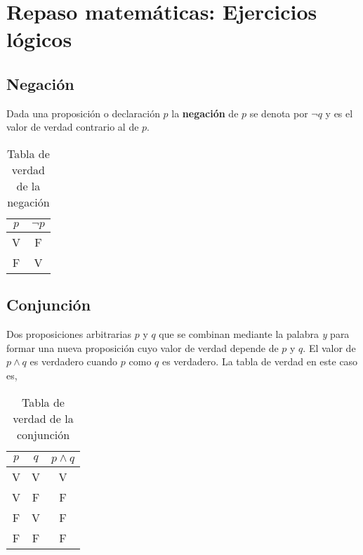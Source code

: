 \documentclass{assignment}
\begin{document}
\maketitle


\section{Repaso matemáticas: Ejercicios lógicos}

\subsection*{Negación}
Dada una proposición o declaración $p$ la \textbf{negación} de $p$ se denota por $\neg q$ y es el valor de verdad contrario al de $p$.

\begin{table}[h]
    \centering
    \begin{tabular}{|c|c|}
    \hline
    $p$  & $\neg p$    \\
    \hline
    V  & F    \\
    \hline
    F  & V    \\
    \hline
    \end{tabular}
    \caption{Tabla de verdad de la negación}

\end{table}


\subsection*{Conjunción}
Dos proposiciones arbitrarias $p$ y $q$ que se combinan mediante la palabra \emph{y} para formar una nueva proposición cuyo valor de verdad depende de $p$ y $q.$ El valor de $p \wedge q$ es verdadero cuando $p$ como $q$ es verdadero. La tabla de verdad en este caso es,

\begin{table}[h]
    \centering
    \begin{tabular}{|c|c|c|}
    \hline
    $p$  & $q$ & $p \wedge q$   \\
    \hline
    V  & V & V   \\
    \hline
    V  & F & F   \\
    \hline
    F  & V & F   \\
    \hline
    F  & F & F   \\
    \hline
    \end{tabular}
    \caption{Tabla de verdad de la conjunción}

\end{table}
\end{document}
